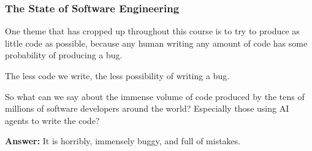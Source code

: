 \documentclass[aspectratio=169, handout]{beamer}
\begin{document}
\begin{frame}[fragile]
  \frametitle{The State of Software Engineering}

  One theme that has cropped up throughout this course is to try
  to produce as little code as possible, because any human writing any
  amount of code has some probability of producing a bug.

  \pause
  \vspace{\fill}

  The less code we write, the less possibility of writing a bug.

  \pause
  \vspace{\fill}

  So what can we say about the immense volume of code produced by
  the tens of millions of software developers around the world? Especially
  those using AI agents to write the code?

  \pause
  \vspace{\fill}

  \textbf{Answer:} It is horribly, immensely buggy, and full of mistakes.
\end{frame}
\end{document}
